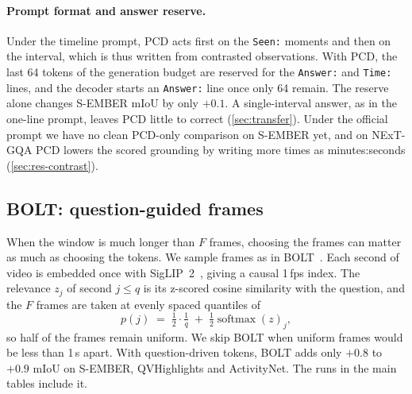 \paragraph{Prompt format and answer reserve.}
Under the timeline prompt, PCD acts first on the \texttt{Seen:} moments and then on the interval, which is thus
written from contrasted observations. With PCD, the last 64 tokens of the generation budget are reserved for the
\texttt{Answer:} and \texttt{Time:} lines, and the decoder starts an \texttt{Answer:} line once only 64 remain. The
reserve alone changes S-EMBER mIoU by only $+0.1$. A single-interval answer, as in the one-line prompt, leaves PCD
little to correct (\cref{sec:transfer}). Under the official prompt we have no clean PCD-only comparison on S-EMBER
yet, and on NExT-GQA PCD lowers the scored grounding by writing more times as minutes:seconds
(\cref{sec:res-contrast}).

\subsection{BOLT: question-guided frames}
\label{sec:retrieval}

When the window is much longer than $F$ frames, choosing the frames can matter as much as choosing the tokens. We
sample frames as in BOLT~\cite{bolt}. Each second of video is embedded once with SigLIP~2~\cite{siglip2}, giving a
causal 1\,fps index. The relevance $z_j$ of second $j \leq q$ is its z-scored
cosine similarity with the question, and the $F$ frames are taken at evenly spaced quantiles of
\begin{equation}
  p(j) \;=\; \tfrac{1}{2}\cdot\tfrac{1}{q} \;+\; \tfrac{1}{2}\operatorname{softmax}(z)_j ,
\end{equation}
so half of the frames remain uniform. We skip BOLT when uniform frames would be less than 1\,s apart. With
question-driven tokens, BOLT adds only $+0.8$ to $+0.9$ mIoU on S-EMBER, QVHighlights and ActivityNet. The runs in
the main tables include it.
